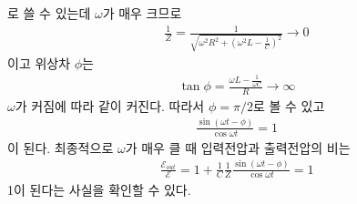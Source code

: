 \documentclass[tightenlines,floatfix,nofootinbib,superscriptaddress,fleqn]{revtex4}
\begin{document}
로 쓸 수 있는데 $\omega$가 매우 크므로
\begin{align}
  \frac{1}{Z}=\frac{1}{\sqrt{\omega^2R^2
  +\left(\omega^2 L-\frac{1}{C}\right)^2}}
  \longrightarrow 0
\end{align}
이고 위상차  $\phi$는
\begin{align}
  \tan \phi = \frac{\omega L - \frac{1}{\omega C}}{R}
  \longrightarrow \infty
\end{align}
$\omega$가 커짐에 따라 같이 커진다. 따라서 $\phi = \pi/2$로 볼 수 있고
\begin{align}
  \frac{\sin(\omega t-\phi)}{\cos\omega t}=1
\end{align} 
이 된다. 최종적으로 $\omega$가 매우 클 때 입력전압과 출력전압의 비는 
\begin{align}
  \frac{\mathcal{E}_{out}}{\mathcal{E}}=1+\frac{1}{C}\frac{1}{Z}
  \frac{\sin(\omega t-\phi)}{\cos\omega t}=1
\end{align}
1이 된다는 사실을 확인할 수 있다.
\end{document}
